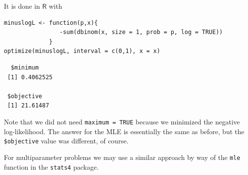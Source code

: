 \documentclass[captions=tableheading]{scrbook}
\begin{document}
It is done in \(\mathsf{R}\) with


\lstset{language=R}
\begin{lstlisting}
minuslogL <- function(p,x){
                -sum(dbinom(x, size = 1, prob = p, log = TRUE))
             }
optimize(minuslogL, interval = c(0,1), x = x)
\end{lstlisting}

\begin{verbatim}
  $minimum
 [1] 0.4062525
 
 $objective
 [1] 21.61487
\end{verbatim}

Note that we did not need \texttt{maximum = TRUE} because we minimized the negative log-likelihood. The answer for the MLE is essentially the same as before, but the \texttt{\$objective} value was different, of course.

For multiparameter problems we may use a similar approach by way of the \texttt{mle} function in the \texttt{stats4} package. 
\end{document}
